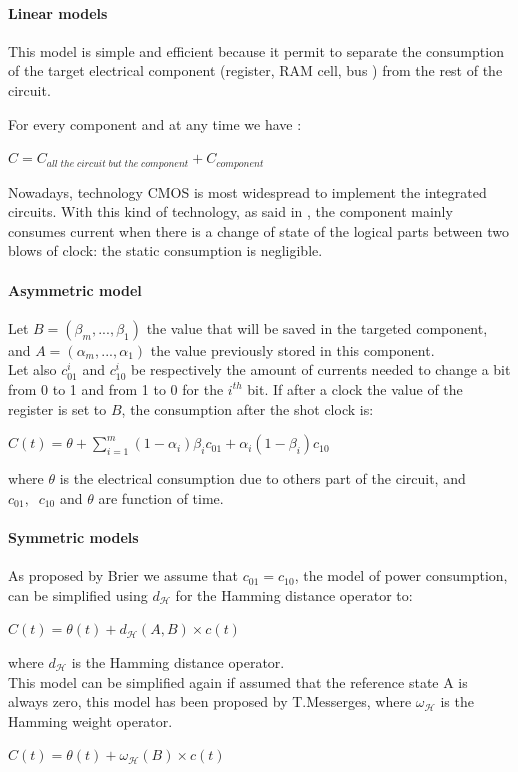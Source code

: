 \paragraph*{Linear models}

This model is simple and efficient because it permit to separate the consumption of 
the target electrical component (register, RAM cell, bus ) from the rest of the circuit.

For every component and at any time we have :
\begin{center}
$C =  C_{\mathit{all \; the \; circuit \; but \; the \; component}}+C_{component}$
\end{center}
Nowadays, technology CMOS is most widespread to implement the integrated circuits.
With this kind of technology, as said in \cite{phd-Messerges-2000}, the component mainly consumes
current when there is a change of state of the logical parts between two blows of clock:
the static consumption is negligible.

\paragraph*{Asymmetric model}
Let $ B = (\beta_m,...,\beta_1) $ the value that will be saved in the targeted component,
and $ A = (\alpha_m,...,\alpha_1) $ the value previously stored in this component.\\
Let also $ c_{01}^i$ and $ c_{10}^i$ be respectively the amount of currents needed to
change a bit from 0 to 1 and from 1 to 0 for the $i^{th}$ bit.
If after a clock the value of the register is set to $ B $, the consumption after the shot clock is:
\begin{center}
$C(t) = \theta+  \sum\limits_{i=1}^{m} (1-\alpha_i)\beta_i c_{01} + \alpha_i(1-\beta_i)c_{10} $
\end{center}
where $\theta$ is the electrical consumption due to others part of the circuit, and 
$ c_{01} ,\;\;c_{10}$ and $\theta$ are function of time.

\paragraph*{Symmetric models}
As proposed by Brier \cite{eprint-2003-brier} we assume that $ c_{01} = c_{10}$,
the model of power consumption, can be simplified using 
 $ d_{\mathcal{H}} $ for the Hamming distance operator to: 
\begin{center}
$C(t) = \theta(t)  + d_{\mathcal{H}}(A,B) \times c(t) $
\end{center}
where $ d_{\mathcal{H}} $ is the Hamming distance operator.\\
This model can be simplified again if assumed that the reference state A is always zero,
this model has been proposed by T.Messerges, where $ \omega_{\mathcal{H}} $ is the Hamming weight operator.
\begin{center}
$C(t) = \theta(t)  + \omega_{\mathcal{H}}(B) \times c(t)  $
\end{center}



